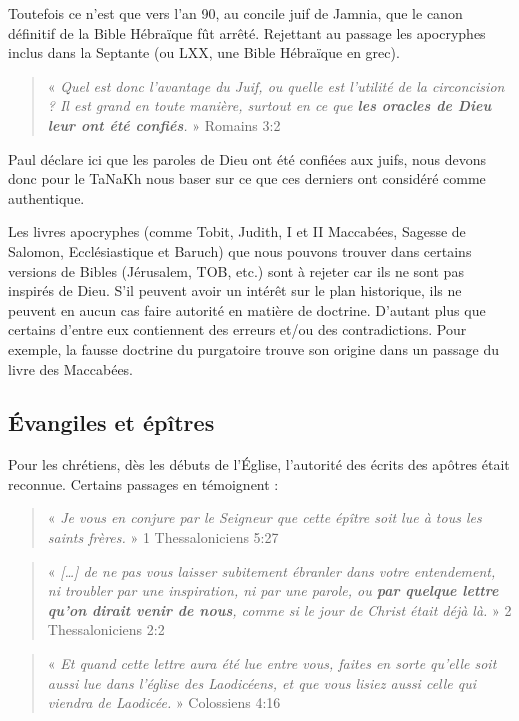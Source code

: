 \begin{small}
Toutefois ce n'est que vers l'an 90, au concile juif de Jamnia, que le canon définitif de la Bible Hébraïque fût arrêté. Rejettant au passage les apocryphes inclus dans la Septante (ou LXX, une Bible Hébraïque en grec).

\begin{quote}
« \emph{Quel est donc l'avantage du Juif, ou quelle est l'utilité de la circoncision ? Il est grand en toute manière, surtout en ce que \textbf{les oracles de Dieu leur ont été confiés}.} » Romains 3:2
\end{quote}

Paul déclare ici que les paroles de Dieu ont été confiées aux juifs, nous devons donc pour le TaNaKh nous baser sur ce que ces derniers ont considéré comme authentique.\bigskip

Les livres apocryphes (comme Tobit, Judith, I et II Maccabées, Sagesse de Salomon, Ecclésiastique et Baruch) que nous pouvons trouver dans certains versions de Bibles (Jérusalem, TOB, etc.) sont à rejeter car ils ne sont pas inspirés de Dieu. S'il peuvent avoir un intérêt sur le plan historique, ils ne peuvent en aucun cas faire autorité en matière de doctrine. D'autant plus que certains d'entre eux contiennent des erreurs et/ou des contradictions. Pour exemple, la fausse doctrine du purgatoire trouve son origine dans un passage du livre des Maccabées.

\subsection*{Évangiles et épîtres}

Pour les chrétiens, dès les débuts de l'Église, l'autorité des écrits des apôtres était reconnue. Certains passages en témoignent :

\begin{quote}
« \emph{Je vous en conjure par le Seigneur que cette épître soit lue à tous les saints frères.} » 1 Thessaloniciens 5:27
\end{quote}

\begin{quote}
« \emph{[…] de ne pas vous laisser subitement ébranler dans votre entendement, ni troubler par une inspiration, ni par une parole, ou \textbf{par quelque lettre qu'on dirait venir de nous}, comme si le jour de Christ était déjà là.} » 2 Thessaloniciens 2:2
\end{quote}

\begin{quote}
« \emph{Et quand cette lettre aura été lue entre vous, faites en sorte qu'elle soit aussi lue dans l'église des Laodicéens, et que vous lisiez aussi celle qui viendra de Laodicée.} » Colossiens 4:16
\end{quote}


\end{small}
